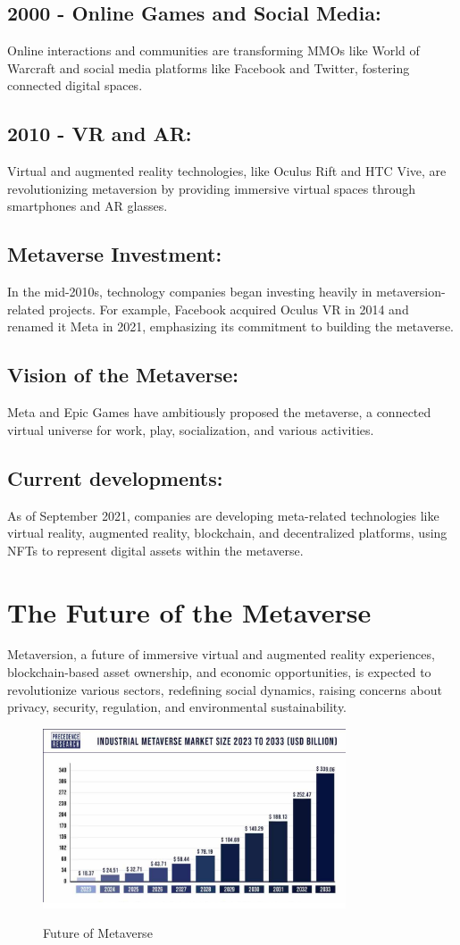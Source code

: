 \subsection{2000 - Online Games and Social Media:}
Online interactions and communities are transforming MMOs like World of Warcraft and social media platforms like Facebook and Twitter, fostering connected digital spaces.
\subsection{2010 - VR and AR:}
Virtual and augmented reality technologies, like Oculus Rift and HTC Vive, are revolutionizing metaversion by providing immersive virtual spaces through smartphones and AR glasses.
\subsection{Metaverse Investment:}
In the mid-2010s, technology companies began investing heavily in metaversion-related projects. For example, Facebook acquired Oculus VR in 2014 and renamed it Meta in 2021, emphasizing its commitment to building the metaverse.
\subsection{Vision of the Metaverse:}
Meta and Epic Games have ambitiously proposed the metaverse, a connected virtual universe for work, play, socialization, and various activities.
\subsection{Current developments:}
As of September 2021, companies are developing meta-related technologies like virtual reality, augmented reality, blockchain, and decentralized platforms, using NFTs to represent digital assets within the metaverse.
\section{The Future of the Metaverse}
Metaversion, a future of immersive virtual and augmented reality experiences, blockchain-based asset ownership, and economic opportunities, is expected to revolutionize various sectors, redefining social dynamics, raising concerns about privacy, security, regulation, and environmental sustainability.
\begin{figure}[h]
    \centering
    \includegraphics[width=0.8\textwidth, height=0.4\textheight]{Images/industrial-metaverse-market-size.png}
    \caption{Future of Metaverse}
    \label{fig:Future of Metaverse}\cite{metaverse-market}
\end{figure}
